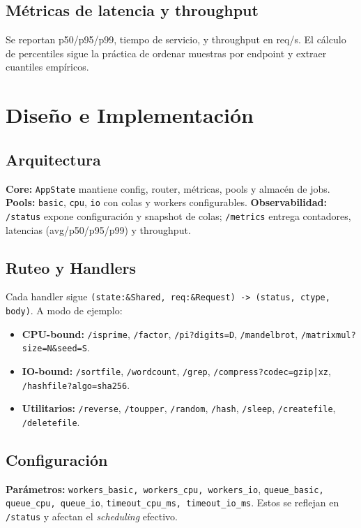 \documentclass[conference]{IEEEtran}
\begin{document}
\subsection{Métricas de latencia y throughput}
Se reportan p50/p95/p99, tiempo de servicio, y throughput en req/s. El cálculo de percentiles sigue la práctica de ordenar muestras por endpoint y extraer cuantiles empíricos.

\section{Diseño e Implementación}
\subsection{Arquitectura}
\textbf{Core:} \texttt{AppState} mantiene config, router, métricas, pools y almacén de jobs.  
\textbf{Pools:} \texttt{basic}, \texttt{cpu}, \texttt{io} con colas y workers configurables.  
\textbf{Observabilidad:}
\texttt{/status} expone configuración y snapshot de colas; \texttt{/metrics} entrega contadores, latencias (avg/p50/p95/p99) y throughput.

\subsection{Ruteo y Handlers}
Cada handler sigue \texttt{(state:\&Shared, req:\&Request) -> (status, ctype, body)}. A modo de ejemplo:
\begin{itemize}
  \item \textbf{CPU-bound:} \texttt{/isprime}, \texttt{/factor}, \texttt{/pi?digits=D}, \texttt{/mandelbrot}, \texttt{/matrixmul?size=N\&seed=S}.
  \item \textbf{IO-bound:} \texttt{/sortfile}, \texttt{/wordcount}, \texttt{/grep}, \texttt{/compress?codec=gzip|xz}, \texttt{/hashfile?algo=sha256}.
  \item \textbf{Utilitarios:} \texttt{/reverse}, \texttt{/toupper}, \texttt{/random}, \texttt{/hash}, \texttt{/sleep}, \texttt{/createfile}, \texttt{/deletefile}.
\end{itemize}

\subsection{Configuración}
\textbf{Parámetros:} \texttt{workers\_basic, workers\_cpu, workers\_io}, \texttt{queue\_basic, queue\_cpu, queue\_io}, \texttt{timeout\_cpu\_ms, timeout\_io\_ms}.  
Estos se reflejan en \texttt{/status} y afectan el \emph{scheduling} efectivo.
\end{document}
